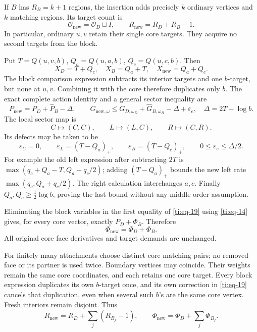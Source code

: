 \documentclass[11pt]{article}
\numberwithin{equation}{section}
\theoremstyle{definition}\newtheorem{definition}[theorem]{Definition}
\theoremstyle{remark}\newtheorem{remark}[theorem]{Remark}
\begin{document}
If \(B\) has \(R_B=k+1\) regions, the insertion adds precisely \(k\) ordinary vertices and \(k\) matching regions. Its target count is
\begin{equation}\label{ti:eq-17}
\mathcal O_{\mathrm{new}}=\mathcal O_D\sqcup I,\qquad
R_{\mathrm{new}}=R_D+R_B-1.
\end{equation}
In particular, ordinary \(u,v\) retain their single core targets. They acquire no second targets from the block.

Put \(T=Q(u,v,b)\), \(Q_a=Q(u,a,b)\), \(Q_c=Q(u,c,b)\). Then
\begin{equation}\label{ti:eq-18}
X_D=T+Q_c,\quad X_B=Q_a+T,\quad X_{\mathrm{new}}=Q_a+Q_c.
\end{equation}
The block comparison expression subtracts its interior targets and one \(b\)-target, but none at \(u,v\). Combining it with the core therefore duplicates only \(b\). The exact complete action identity and a general sector inequality are
\begin{equation}\label{ti:eq-19}
P_{\mathrm{new}}=P_D+\widehat P_B-\Delta,\qquad
G_{\mathrm{new},\omega}\le
G_{D,\omega_D}+\widehat G_{B,\omega_B}-\Delta+\varepsilon_e,
\quad \Delta=2T-\log b.
\end{equation}
The local sector map is
\begin{equation}\label{ti:eq-20}
C\mapsto(C,C),\qquad L\mapsto(L,C),\qquad R\mapsto(C,R).
\end{equation}
Its defects may be taken to be
\begin{equation}\label{ti:eq-20a}
\varepsilon_C=0,\qquad
\varepsilon_L=(T-Q_a)_+,\qquad
\varepsilon_R=(T-Q_c)_+,\qquad
0\le\varepsilon_e\le\Delta/2.
\end{equation}
For example the old left expression after subtracting \(2T\) is
\(\max(q_c+Q_a-T,Q_a+q_c/2)\); adding \((T-Q_a)_+\) bounds the new left rate \(\max(q_c,Q_a+q_c/2)\). The right calculation interchanges \(a,c\). Finally \(Q_a,Q_c\ge\frac12\log b\), proving the last bound without any middle-order assumption.

Eliminating the block variables in the first equality of \eqref{ti:eq-19} using \eqref{ti:eq-14} gives, for every core vector, exactly \(P_D+\Phi_B\). Therefore
\begin{equation}\label{ti:eq-21}
\Phi_{\mathrm{new}}=\Phi_D+\Phi_B.
\end{equation}
All original core face derivatives and target demands are unchanged.

For finitely many attachments choose distinct core matching pairs; no removed face or its partner is used twice. Boundary vertices may coincide. Their weights remain the same core coordinates, and each retains one core target. Every block expression duplicates its own \(b\)-target once, and its own correction in \eqref{ti:eq-19} cancels that duplication, even when several such \(b\)'s are the same core vertex. Fresh interiors remain disjoint. Thus
\begin{equation}\label{ti:eq-22}
R_{\mathrm{new}}=R_D+\sum_j(R_{B_j}-1),
\qquad
\Phi_{\mathrm{new}}=\Phi_D+\sum_j\Phi_{B_j}.
\end{equation}
\end{document}
